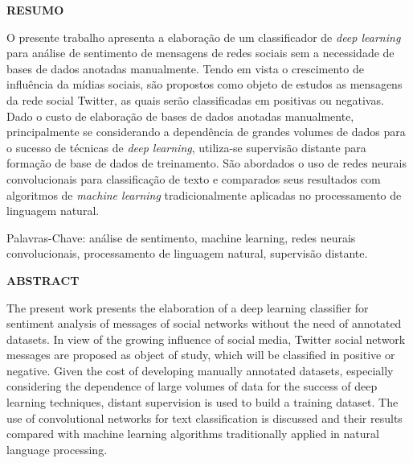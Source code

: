 \pagebreak

\begin{center}
\textbf{RESUMO}
\end{center}
\vspace{0.5cm}

O presente trabalho apresenta a elaboração de um classificador de \textit{deep learning} para análise de sentimento de
mensagens de redes sociais sem a necessidade de bases de dados anotadas manualmente.
Tendo em vista o crescimento de influência da mídias sociais, são propostos como objeto de estudos as mensagens da rede
social Twitter, as quais serão classificadas em positivas ou negativas.
Dado o custo de elaboração de bases de dados anotadas manualmente, principalmente se considerando a dependência de
grandes volumes de dados para o sucesso de técnicas de \textit{deep learning}, utiliza-se supervisão distante para
formação de base de dados de treinamento.
São abordados o uso de redes neurais convolucionais para classificação de texto e comparados seus resultados com
algoritmos de \textit{machine learning} tradicionalmente aplicadas no processamento de linguagem natural.

\vspace{0.5cm}

\noindent Palavras-Chave: análise de sentimento, machine learning, redes neurais convolucionais, processamento de
linguagem natural, supervisão distante.

\pagebreak

\begin{center}
\textbf{ABSTRACT}
\end{center}
\vspace{0.5cm}

The present work presents the elaboration of a deep learning classifier for sentiment analysis of messages of social
networks without the need of annotated datasets.
In view of the growing influence of social media, Twitter social network messages are proposed as object of study, which
will be classified in positive or negative.
Given the cost of developing manually annotated datasets, especially considering the dependence of large volumes
of data for the success of deep learning techniques, distant supervision is used to build a training dataset.
The use of convolutional networks for text classification is discussed and their results compared with machine learning
algorithms traditionally applied in natural language processing.

\vspace{0.5cm}

